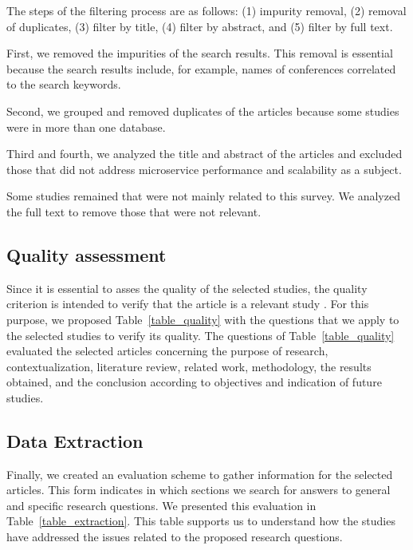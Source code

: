 The steps of the filtering process are as follows: (1) impurity removal, (2) removal of duplicates, (3) filter by title, (4) filter by abstract, and (5) filter by full text.

First, we removed the impurities of the search results. This removal is essential because the search results include, for example, names of conferences correlated to the search keywords. 

Second, we grouped and removed duplicates of the articles because some studies were in more than one database.

Third and fourth, we analyzed the title and abstract of the articles and excluded those that did not address microservice performance and scalability as a subject.

Some studies remained that were not mainly related to this survey. We analyzed the full text to remove those that were not relevant.




\subsection{Quality assessment}
\label{quality_assessment}
Since it is essential to asses the quality of the selected studies, the quality criterion is intended to verify that the article is a relevant study \cite{Petticrew2006SystematicSciences}. For this purpose, we proposed Table~\ref{table_quality} with the questions that we apply to the selected studies to verify its quality. The questions of Table~\ref{table_quality} evaluated the selected articles concerning the purpose of research, contextualization, literature review, related work, methodology, the results obtained, and the conclusion according to objectives and indication of future studies.

\subsection{Data Extraction}
\label{data_extraction}
Finally, we created an evaluation scheme to gather information for the selected articles. This form indicates in which sections we search for answers to general and specific research questions. We presented this evaluation in Table~\ref{table_extraction}. This table supports us to understand how the studies have addressed the issues related to the proposed research questions.
